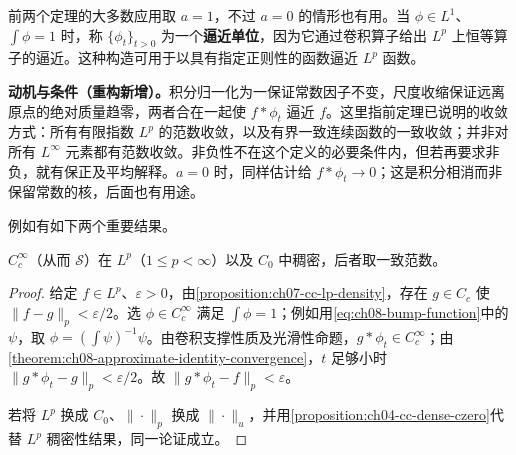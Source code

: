 \documentclass[../../main.tex]{subfiles}
\begin{document}
\begin{definition}[逼近单位]\label{definition:ch08-approximate-identity}
前两个定理的大多数应用取 $a=1$，不过 $a=0$ 的情形也有用。当 $\phi\in L^1$、$\int\phi=1$ 时，称 $\{\phi_t\}_{t>0}$ 为一个\textbf{逼近单位}，因为它通过卷积算子给出 $L^p$ 上恒等算子的逼近。这种构造可用于以具有指定正则性的函数逼近 $L^p$ 函数。
\end{definition}
\begin{remark}
\textbf{动机与条件（重构新增）。}积分归一化为一保证常数因子不变，尺度收缩保证远离原点的绝对质量趋零，两者合在一起使 $f*\phi_t$ 逼近 $f$。这里指前定理已说明的收敛方式：所有有限指数 $L^p$ 的范数收敛，以及有界一致连续函数的一致收敛；并非对所有 $L^\infty$ 元素都有范数收敛。非负性不在这个定义的必要条件内，但若再要求非负，就有保正及平均解释。$a=0$ 时，同样估计给 $f*\phi_t\to0$；这是积分相消而非保留常数的核，后面也有用途。
\end{remark}
例如有如下两个重要结果。
\begin{proposition}\label{proposition:ch08-smooth-density}
$C_c^\infty$（从而 $\mathcal S$）在 $L^p$（$1\leqslant p<\infty$）以及 $C_0$ 中稠密，后者取一致范数。
\end{proposition}
\begin{proof}
给定 $f\in L^p$、$\varepsilon>0$，由\cref{proposition:ch07-cc-lp-density}，存在 $g\in C_c$ 使 $\|f-g\|_p<\varepsilon/2$。选 $\phi\in C_c^\infty$ 满足 $\int\phi=1$；例如用\cref{eq:ch08-bump-function}中的 $\psi$，取 $\phi=(\int\psi)^{-1}\psi$。由卷积支撑性质及光滑性命题，$g*\phi_t\in C_c^\infty$；由\cref{theorem:ch08-approximate-identity-convergence}，$t$ 足够小时 $\|g*\phi_t-g\|_p<\varepsilon/2$。故 $\|g*\phi_t-f\|_p<\varepsilon$。

若将 $L^p$ 换成 $C_0$、$\|\cdot\|_p$ 换成 $\|\cdot\|_u$，并用\cref{proposition:ch04-cc-dense-czero}代替 $L^p$ 稠密性结果，同一论证成立。
\end{proof}
\end{document}
